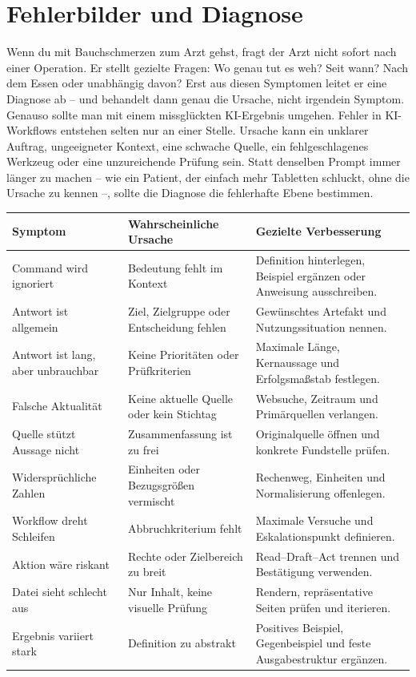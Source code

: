 \chapter{Fehlerbilder und Diagnose}

Wenn du mit Bauchschmerzen zum Arzt gehst, fragt der Arzt nicht sofort nach einer Operation. Er stellt gezielte Fragen: Wo genau tut es weh? Seit wann? Nach dem Essen oder unabhängig davon? Erst aus diesen Symptomen leitet er eine Diagnose ab -- und behandelt dann genau die Ursache, nicht irgendein Symptom. Genauso sollte man mit einem missglückten KI-Ergebnis umgehen. Fehler in KI-Workflows entstehen selten nur an einer Stelle. Ursache kann ein unklarer Auftrag, ungeeigneter Kontext, eine schwache Quelle, ein fehlgeschlagenes Werkzeug oder eine unzureichende Prüfung sein. Statt denselben Prompt immer länger zu machen -- wie ein Patient, der einfach mehr Tabletten schluckt, ohne die Ursache zu kennen --, sollte die Diagnose die fehlerhafte Ebene bestimmen.

\begin{longtable}{@{}p{}p{}p{}@{}}\toprule
\textbf{Symptom}&\textbf{Wahrscheinliche Ursache}&\textbf{Gezielte Verbesserung}\\\midrule\endhead
Command wird ignoriert&Bedeutung fehlt im Kontext&Definition hinterlegen, Beispiel ergänzen oder Anweisung ausschreiben.\\
Antwort ist allgemein&Ziel, Zielgruppe oder Entscheidung fehlen&Gewünschtes Artefakt und Nutzungssituation nennen.\\
Antwort ist lang, aber unbrauchbar&Keine Prioritäten oder Prüfkriterien&Maximale Länge, Kernaussage und Erfolgsmaßstab festlegen.\\
Falsche Aktualität&Keine aktuelle Quelle oder kein Stichtag&Websuche, Zeitraum und Primärquellen verlangen.\\
Quelle stützt Aussage nicht&Zusammenfassung ist zu frei&Originalquelle öffnen und konkrete Fundstelle prüfen.\\
Widersprüchliche Zahlen&Einheiten oder Bezugsgrößen vermischt&Rechenweg, Einheiten und Normalisierung offenlegen.\\
Workflow dreht Schleifen&Abbruchkriterium fehlt&Maximale Versuche und Eskalationspunkt definieren.\\
Aktion wäre riskant&Rechte oder Zielbereich zu breit&Read--Draft--Act trennen und Bestätigung verwenden.\\
Datei sieht schlecht aus&Nur Inhalt, keine visuelle Prüfung&Rendern, repräsentative Seiten prüfen und iterieren.\\
Ergebnis variiert stark&Definition zu abstrakt&Positives Beispiel, Gegenbeispiel und feste Ausgabestruktur ergänzen.\\\bottomrule
\end{longtable}

